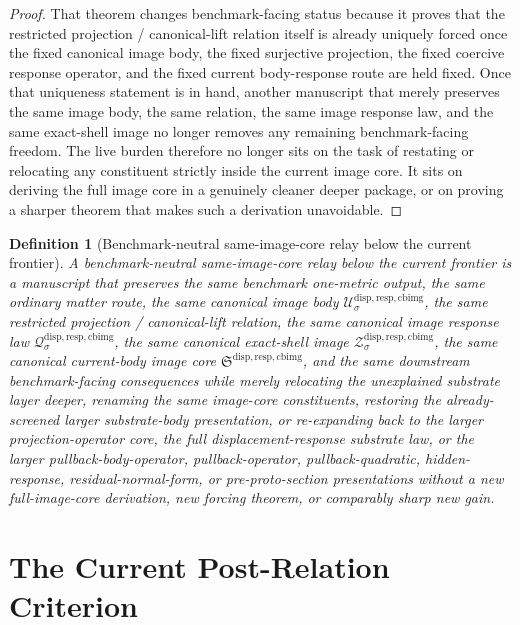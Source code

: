 \documentclass[11pt]{article}
\newcommand{\CurrentBodyImageCore}{\mathfrak S^{\mathrm{disp,resp,cbimg}}}
\newcommand{\CanonicalImageBody}[1]{\mathcal U_{#1}^{\mathrm{disp,resp,cbimg}}}
\newcommand{\CanonicalImageShell}[1]{\mathcal Z_{#1}^{\mathrm{disp,resp,cbimg}}}
\newcommand{\CanonicalImageResponseLaw}[1]{\mathscr Q_{#1}^{\mathrm{disp,resp,cbimg}}}
\newtheorem{definition}{Definition}
\begin{document}
\begin{proof}
That theorem changes benchmark-facing status because it proves that the restricted projection / canonical-lift relation itself is already uniquely forced once the fixed canonical image body, the fixed surjective projection, the fixed coercive response operator, and the fixed current body-response route are held fixed. Once that uniqueness statement is in hand, another manuscript that merely preserves the same image body, the same relation, the same image response law, and the same exact-shell image no longer removes any remaining benchmark-facing freedom. The live burden therefore no longer sits on the task of restating or relocating any constituent strictly inside the current image core. It sits on deriving the full image core in a genuinely cleaner deeper package, or on proving a sharper theorem that makes such a derivation unavoidable.
\end{proof}

\begin{definition}[Benchmark-neutral same-image-core relay below the current frontier]
A \emph{benchmark-neutral same-image-core relay below the current frontier} is a manuscript that preserves the same benchmark one-metric output, the same ordinary matter route, the same canonical image body \(\CanonicalImageBody{\sigma}\), the same restricted projection / canonical-lift relation, the same canonical image response law \(\CanonicalImageResponseLaw{\sigma}\), the same canonical exact-shell image \(\CanonicalImageShell{\sigma}\), the same canonical current-body image core \(\CurrentBodyImageCore\), and the same downstream benchmark-facing consequences while merely relocating the unexplained substrate layer deeper, renaming the same image-core constituents, restoring the already-screened larger substrate-body presentation, or re-expanding back to the larger projection-operator core, the full displacement-response substrate law, or the larger pullback-body-operator, pullback-operator, pullback-quadratic, hidden-response, residual-normal-form, or pre-proto-section presentations without a new full-image-core derivation, new forcing theorem, or comparably sharp new gain.
\end{definition}

\section{The Current Post-Relation Criterion}
\end{document}
